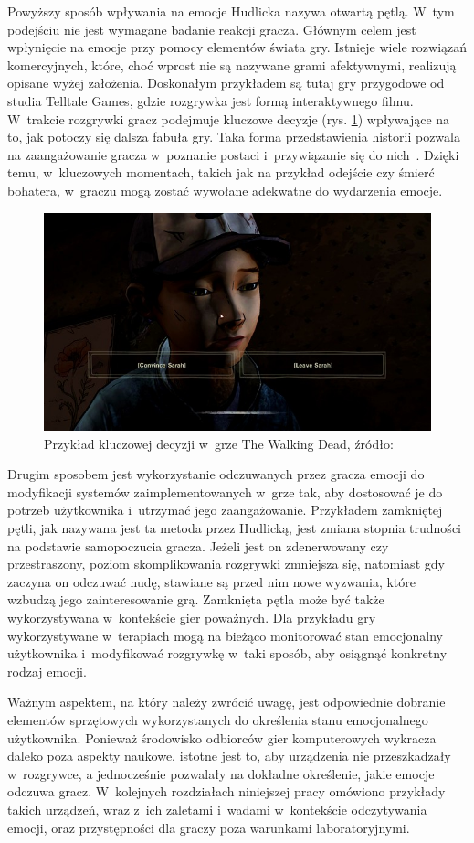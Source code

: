 Powyższy sposób wpływania na emocje Hudlicka nazywa otwartą pętlą. W~tym podejściu nie jest wymagane badanie reakcji gracza. Głównym celem jest wpłynięcie na emocje przy pomocy elementów świata gry. Istnieje wiele rozwiązań komercyjnych, które, choć wprost nie są nazywane grami afektywnymi, realizują opisane wyżej założenia. Doskonałym przykładem są tutaj gry przygodowe od studia Telltale Games, gdzie rozgrywka jest formą interaktywnego filmu. W~trakcie rozgrywki gracz podejmuje kluczowe decyzje (rys. \ref{fig:walking_dead}) wpływające na to, jak potoczy się dalsza fabuła gry. Taka forma przedstawienia historii pozwala na zaangażowanie gracza w~poznanie postaci i~przywiązanie się do nich~\cite{games_for_empathy}. Dzięki temu, w~kluczowych momentach, takich jak na przykład odejście czy śmierć bohatera, w~graczu mogą zostać wywołane adekwatne do wydarzenia emocje.
\begin{figure}
	\centering
	\includegraphics[width=0.7\linewidth]{images/walking_dead_decision.jpg}
	\caption{Przykład kluczowej decyzji w~grze The Walking Dead, źródło:~\cite{the_walking_dead}}
	\label{fig:walking_dead}
\end{figure}

Drugim sposobem jest wykorzystanie odczuwanych przez gracza emocji do modyfikacji systemów zaimplementowanych w~grze tak, aby dostosować je do potrzeb użytkownika i~utrzymać jego zaangażowanie. Przykładem zamkniętej pętli, jak nazywana jest ta metoda przez Hudlicką, jest zmiana stopnia trudności na podstawie samopoczucia gracza. Jeżeli jest on zdenerwowany czy przestraszony, poziom skomplikowania rozgrywki zmniejsza się, natomiast gdy zaczyna on odczuwać nudę, stawiane są przed nim nowe wyzwania, które wzbudzą jego zainteresowanie grą. Zamknięta pętla może być także wykorzystywana w~kontekście gier poważnych. Dla przykładu gry wykorzystywane w~terapiach mogą na bieżąco monitorować stan emocjonalny użytkownika i~modyfikować rozgrywkę w~taki sposób, aby osiągnąć konkretny rodzaj emocji.

Ważnym aspektem, na który należy zwrócić uwagę, jest odpowiednie dobranie elementów sprzętowych wykorzystanych do określenia stanu emocjonalnego użytkownika. Ponieważ środowisko odbiorców gier komputerowych wykracza daleko poza aspekty naukowe, istotne jest to, aby urządzenia nie przeszkadzały w~rozgrywce, a jednocześnie pozwalały na dokładne określenie, jakie emocje odczuwa gracz. W~kolejnych rozdziałach niniejszej pracy omówiono przykłady takich urządzeń, wraz z~ich zaletami i~wadami w~kontekście odczytywania emocji, oraz przystępności dla graczy poza warunkami laboratoryjnymi.

